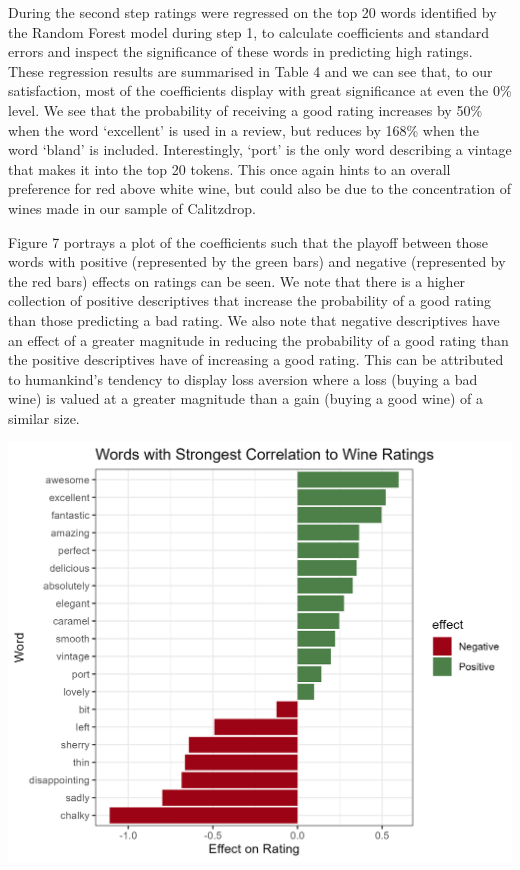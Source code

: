 \documentclass[11pt,preprint]{elsarticle}
\let\origfigure\figure
\let\endorigfigure\endfigure
\renewenvironment{figure}[1][2] {
    \expandafter\origfigure\expandafter[H]
} {
    \endorigfigure
}
\numberwithin{equation}{section}
\numberwithin{figure}{section}
\numberwithin{table}{section}
\begin{document}
During the second step ratings were regressed on the top 20 words
identified by the Random Forest model during step 1, to calculate
coefficients and standard errors and inspect the significance of these
words in predicting high ratings. These regression results are
summarised in Table 4 and we can see that, to our satisfaction, most of
the coefficients display with great significance at even the 0\% level.
We see that the probability of receiving a good rating increases by 50\%
when the word `excellent' is used in a review, but reduces by 168\% when
the word `bland' is included. Interestingly, `port' is the only word
describing a vintage that makes it into the top 20 tokens. This once
again hints to an overall preference for red above white wine, but could
also be due to the concentration of wines made in our sample of
Calitzdrop.

Figure 7 portrays a plot of the coefficients such that the playoff
between those words with positive (represented by the green bars) and
negative (represented by the red bars) effects on ratings can be seen.
We note that there is a higher collection of positive descriptives that
increase the probability of a good rating than those predicting a bad
rating. We also note that negative descriptives have an effect of a
greater magnitude in reducing the probability of a good rating than the
positive descriptives have of increasing a good rating. This can be
attributed to humankind's tendency to display loss aversion where a loss
(buying a bad wine) is valued at a greater magnitude than a gain (buying
a good wine) of a similar size.

\begin{figure}[H]

{\centering \includegraphics[width=0.8\linewidth]{writeup/fig7} 

}

\caption{Plot of coefficients on OLS regression of top 20 words in reviews identified by RandomForest model}\label{fig:fig7}
\end{figure}
\end{document}

